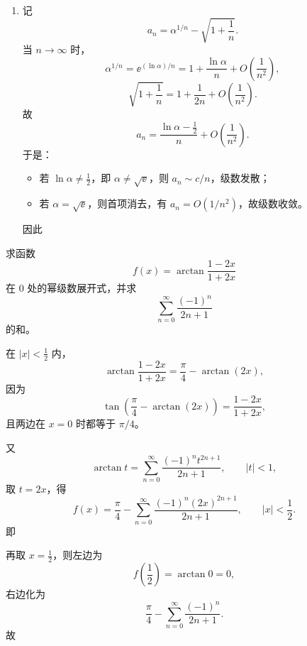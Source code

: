 \begin{question}[含参数级数的敛散性]
\begin{solution}
\begin{enumerate}[label=(\arabic*),leftmargin=2.6em,itemsep=0.25em,topsep=0.2em]
\item 记
\[
a_n=\alpha^{1/n}-\sqrt{1+\frac1n}.
\]
当 $n\to\infty$ 时，
\[
\alpha^{1/n}=\ee^{(\ln\alpha)/n}
=1+\frac{\ln\alpha}{n}+O\!\left(\frac{1}{n^2}\right),
\]
\[
\sqrt{1+\frac1n}=1+\frac{1}{2n}+O\!\left(\frac{1}{n^2}\right).
\]
故
\[
a_n=\frac{\ln\alpha-\frac12}{n}+O\!\left(\frac{1}{n^2}\right).
\]
于是：
\begin{itemize}[leftmargin=2em,itemsep=0.2em,topsep=0.2em]
\item 若 $\ln\alpha\ne \frac12$，即 $\alpha\ne \sqrt\ee$，则 $a_n\sim c/n$，级数发散；
\item 若 $\alpha=\sqrt\ee$，则首项消去，有 $a_n=O(1/n^2)$，故级数收敛。
\end{itemize}
因此
\end{enumerate}
\end{solution}
\end{question}

\begin{question}[幂级数展开与求和]

求函数
\[
f(x)=\arctan\frac{1-2x}{1+2x}
\]
在 $0$ 处的幂级数展开式，并求
\[
\sum_{n=0}^{\infty}\frac{(-1)^n}{2n+1}
\]
的和。

\begin{solution}
在 $|x|<\frac12$ 内，
\[
\arctan\frac{1-2x}{1+2x}=\frac{\pi}{4}-\arctan(2x),
\]
因为
\[
\tan\!\left(\frac{\pi}{4}-\arctan(2x)\right)=\frac{1-2x}{1+2x},
\]
且两边在 $x=0$ 时都等于 $\pi/4$。

又
\[
\arctan t=\sum_{n=0}^{\infty}\frac{(-1)^n t^{2n+1}}{2n+1},
\qquad |t|<1,
\]
取 $t=2x$，得
\[
f(x)=\frac{\pi}{4}-\sum_{n=0}^{\infty}\frac{(-1)^n(2x)^{2n+1}}{2n+1},
\qquad |x|<\frac12.
\]
即

再取 $x=\frac12$，则左边为
\[
f\!\left(\frac12\right)=\arctan 0=0,
\]
右边化为
\[
\frac{\pi}{4}-\sum_{n=0}^{\infty}\frac{(-1)^n}{2n+1}.
\]
故
\end{solution}
\end{question}

